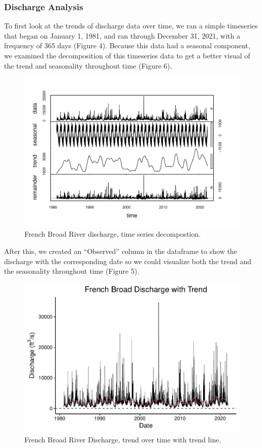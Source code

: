 \documentclass[
]{article}
\begin{document}
\hypertarget{discharge-analysis}{%
\subsubsection{\texorpdfstring{\textbf{Discharge
Analysis}}{Discharge Analysis}}\label{discharge-analysis}}

To first look at the trends of discharge data over time, we ran a simple
timeseries that began on January 1, 1981, and ran through December 31,
2021, with a frequency of 365 days (Figure 4). Because this data had a
seasonal component, we examined the decomposition of this timeseries
data to get a better visual of the trend and seasonality throughout time
(Figure 6).

\begin{figure}
\centering
\includegraphics{SD_AD_NVT_EDAfinal_files/figure-latex/unnamed-chunk-9-1.pdf}
\caption{French Broad River discharge, time series decompostion.}
\end{figure}

After this, we created an ``Observed'' column in the dataframe to show
the discharge with the corresponding date so we could visualize both the
trend and the seasonality throughout time (Figure 5).

\begin{figure}
\centering
\includegraphics{SD_AD_NVT_EDAfinal_files/figure-latex/unnamed-chunk-10-1.pdf}
\caption{French Broad River Discharge, trend over time with trend line.}
\end{figure}
\end{document}

